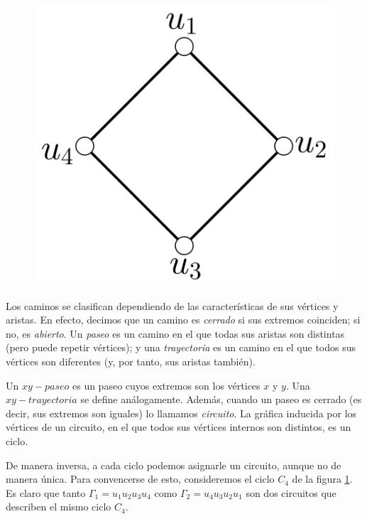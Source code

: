 \begin{figure}
\centering
\includegraphics[scale=0.2]{img/imgchapter1/GrafoCiclo.jpg}
\caption{}
\label{fig:cicloc4}
\vspace{-0.5cm}
\end{figure}
Los caminos se clasifican dependiendo de las características de sus vértices y aristas. En efecto, decimos que un camino es \textit{cerrado}  si sus extremos coinciden; si no, es \textit{abierto}.  Un \textit{paseo}  es un camino en el que todas sus aristas son distintas (pero puede repetir vértices); y una \textit{trayectoria}  es un camino en el que todos sus vértices son diferentes (y, por tanto, sus aristas también). 


Un $xy-paseo$ es un paseo cuyos extremos son los vértices $x$ y $y$. Una $xy-trayectoria$ se define análogamente. Además, cuando un paseo es cerrado (es decir, sus extremos son iguales) lo llamamos \textit{circuito}.  La gráfica inducida por los vértices de un circuito, en el que todos sus vértices internos son distintos, es un ciclo.

De manera inversa, a cada ciclo podemos asignarle un circuito, aunque no de manera única. Para convencerse de esto, consideremos el ciclo $C_{4}$ de la figura \ref{fig:cicloc4}. Es claro que tanto $\Gamma_{1} = u_{1}u_{2}u_{3}u_{4}$ como $\Gamma_{2} = u_{4}u_{3}u_{2}u_{1}$ son dos circuitos que describen el mismo ciclo $C_{4}$. 

